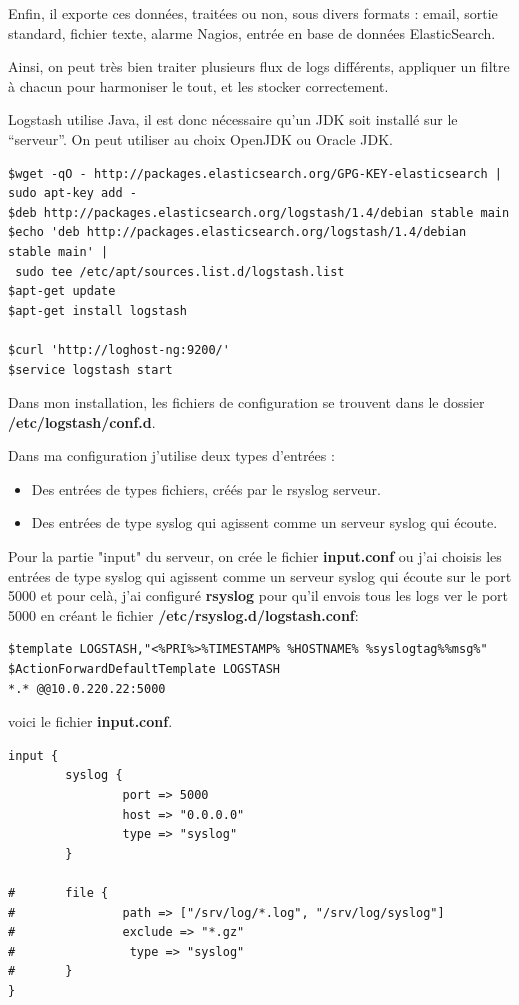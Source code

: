 \documentclass[11pt,a4paper]{article}
\begin{document}
Enfin, il exporte ces données, traitées ou non, sous divers formats : email, sortie standard, fichier texte, alarme Nagios, entrée en base de données ElasticSearch.

Ainsi, on peut très bien traiter plusieurs flux de logs différents, appliquer un filtre à chacun pour harmoniser le tout, et les stocker correctement.

Logstash utilise Java, il est donc nécessaire qu’un JDK soit installé sur le “serveur”. On peut utiliser au choix OpenJDK ou Oracle JDK.

\begin{verbatim}
$wget -qO - http://packages.elasticsearch.org/GPG-KEY-elasticsearch | sudo apt-key add -
$deb http://packages.elasticsearch.org/logstash/1.4/debian stable main
$echo 'deb http://packages.elasticsearch.org/logstash/1.4/debian stable main' | 
 sudo tee /etc/apt/sources.list.d/logstash.list
$apt-get update
$apt-get install logstash
 
$curl 'http://loghost-ng:9200/'
$service logstash start 
\end{verbatim}
Dans mon installation, les fichiers de configuration se trouvent dans le dossier \textbf{/etc/logstash/conf.d}.

Dans ma configuration j’utilise deux types d’entrées :
\begin{itemize}
    \item Des entrées de types fichiers, créés par le rsyslog serveur.
    \item Des entrées de type syslog qui agissent comme un serveur syslog qui écoute.
\end{itemize}

Pour la partie "input" du serveur, on crée le fichier \textbf{input.conf} ou j'ai choisis les entrées de type syslog qui agissent comme un serveur syslog qui écoute sur le port 5000 et pour celà, j'ai configuré \textbf{rsyslog} pour qu'il envois tous les logs ver le port 5000 en créant le fichier \textbf{/etc/rsyslog.d/logstash.conf}:
\begin{verbatim}
$template LOGSTASH,"<%PRI%>%TIMESTAMP% %HOSTNAME% %syslogtag%%msg%"
$ActionForwardDefaultTemplate LOGSTASH
*.* @@10.0.220.22:5000
\end{verbatim}
voici le fichier \textbf{input.conf}.
\begin{verbatim}
input {
        syslog {
                port => 5000
                host => "0.0.0.0"
                type => "syslog"
        }

#       file {
#               path => ["/srv/log/*.log", "/srv/log/syslog"]
#               exclude => "*.gz"
#                type => "syslog"
#       }
}


\end{verbatim}
\end{document}
